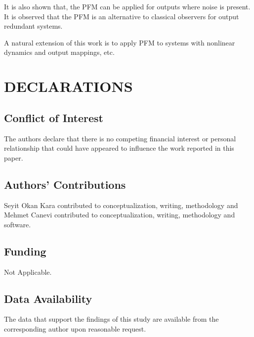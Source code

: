 \documentclass[pdflatex,sn-mathphys-num]{sn-jnl}%
\theoremstyle{thmstyleone}%
\theoremstyle{thmstyletwo}%
\theoremstyle{thmstylethree}%
\begin{document}
It is also shown that, the PFM can be applied for outputs where noise is present. It is observed that the PFM is an alternative to classical observers for output redundant systems.

A natural extension of this work is to apply PFM to systems with nonlinear dynamics and output mappings, etc. 

\section*{DECLARATIONS}
 
\subsection*{Conflict of Interest}
The authors declare that there is no competing financial interest or personal relationship that could have appeared to influence the work reported in this paper.
 
\subsection*{Authors’ Contributions}
Seyit Okan Kara contributed to conceptualization, writing, methodology and Mehmet Canevi contributed to conceptualization, writing, methodology and software.
 
\subsection*{Funding}
Not Applicable.
 
\subsection*{Data Availability}
The data that support the findings of this study are
available from the corresponding author upon reasonable request.


%     
\end{document}
